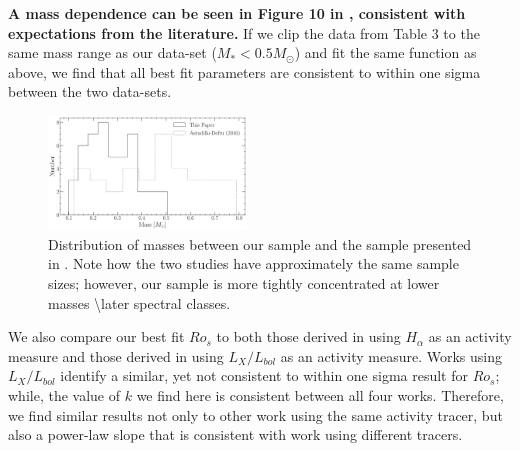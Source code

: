 \textbf{A mass dependence can be seen in Figure 10 in \citet{Def17}, consistent
with expectations from the literature.} If we clip the data from \citet{Def17}
Table 3 to the same mass range as our data-set ($M_{*} < 0.5M_{\odot}$) and fit
the same function as above, we find that all best fit parameters are consistent
to within one sigma between the two data-sets. 

\begin{figure}
    \centering
    \includegraphics[width=0.47\textwidth]{figures/magActivity/B2020vsAD2016_Masses.pdf}
	\caption{Distribution of masses between our sample and the sample presented
	in \citet{Def17}. Note how the two studies have approximately the same
	sample sizes; however, our sample is more tightly concentrated at lower
	masses \textbackslash later spectral classes.}
    \label{fig:massDistribution}
\end{figure}

We also compare our best fit $Ro_{s}$ to both those derived in
\citet{Newton2017} using $H_{\alpha}$ as an activity measure and those derived
in \citep{ Wri18, Magaudda2020} using $L_{X}/L_{bol}$ as an activity measure.
Works using $L_{X}/L_{bol}$ identify a similar, yet not consistent to within
one sigma result for $Ro_{s}$; while, the value of $k$ we find here is
consistent between all four works. Therefore, we find similar results not only
to other work using the same activity tracer, but also a power-law slope that
is consistent with work using different tracers. 
